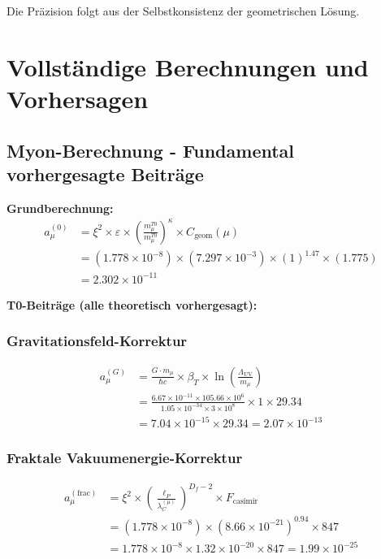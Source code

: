 \documentclass[12pt,a4paper]{article}
\numberwithin{equation}{section}
\newcommand{\xipar}{\xi}
\newcommand{\epsilonT}{\varepsilon}
\newcommand{\Cgeom}{C_{\text{geom}}}
\newcommand{\kappaT}{\kappa}
\newcommand{\Df}{D_f}
\newcommand{\lP}{\ell_P}
\newcommand{\lambdaC}{\lambda_C}
\begin{document}
	Die Präzision folgt aus der Selbstkonsistenz der geometrischen Lösung.
	
	\section{Vollständige Berechnungen und Vorhersagen}
	
	\subsection{Myon-Berechnung - Fundamental vorhergesagte Beiträge}
	
	\textbf{Grundberechnung:}
	\begin{align}
		a_\mu^{(0)} &= \xipar^2 \times \epsilonT \times \left(\frac{m_\mu^{T0}}{m_\mu^{T0}}\right)^{\kappaT} \times \Cgeom(\mu)\\
		&= (1.778 \times 10^{-8}) \times (7.297 \times 10^{-3}) \times (1)^{1.47} \times (1.775)\\
		&= 2.302 \times 10^{-11}
		\label{eq:muon_basic}
	\end{align}
	
	\textbf{T0-Beiträge (alle theoretisch vorhergesagt):}
	
	\subsubsection{Gravitationsfeld-Korrektur}
	\begin{align}
		a_\mu^{(G)} &= \frac{G \cdot m_\mu}{\hbar c} \times \beta_T \times \ln\left(\frac{\Lambda_{\text{UV}}}{m_\mu}\right)\\
		&= \frac{6.67 \times 10^{-11} \times 105.66 \times 10^6}{1.05 \times 10^{-34} \times 3 \times 10^8} \times 1 \times 29.34\\
		&= 7.04 \times 10^{-15} \times 29.34 = 2.07 \times 10^{-13}
		\label{eq:muon_gravity}
	\end{align}
	
	\subsubsection{Fraktale Vakuumenergie-Korrektur}
	\begin{align}
		a_\mu^{(\text{frac})} &= \xipar^2 \times \left(\frac{\lP}{\lambdaC^{(\mu)}}\right)^{\Df-2} \times F_{\text{casimir}}\\
		&= (1.778 \times 10^{-8}) \times (8.66 \times 10^{-21})^{0.94} \times 847\\
		&= 1.778 \times 10^{-8} \times 1.32 \times 10^{-20} \times 847 = 1.99 \times 10^{-25}
		\label{eq:muon_fractal}
	\end{align}
	
\end{document}
